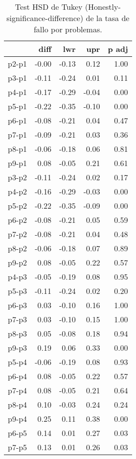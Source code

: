 \begin{table}[H]
\centering
\caption{Test HSD de Tukey (Honestly-significance-difference) de la tasa de fallo por problemas.}
\label{tab:Tukeyfailratio}
\begin{tabular}{rrrrr}
  \hline
 & diff & lwr & upr & p adj \\ 
  \hline
p2-p1 & -0.00 & -0.13 & 0.12 & 1.00 \\ 
  p3-p1 & -0.11 & -0.24 & 0.01 & 0.11 \\ 
  p4-p1 & -0.17 & -0.29 & -0.04 & 0.00 \\ 
  p5-p1 & -0.22 & -0.35 & -0.10 & 0.00 \\ 
  p6-p1 & -0.08 & -0.21 & 0.04 & 0.47 \\ 
  p7-p1 & -0.09 & -0.21 & 0.03 & 0.36 \\ 
  p8-p1 & -0.06 & -0.18 & 0.06 & 0.81 \\ 
  p9-p1 & 0.08 & -0.05 & 0.21 & 0.61 \\ 
  p3-p2 & -0.11 & -0.24 & 0.02 & 0.17 \\ 
  p4-p2 & -0.16 & -0.29 & -0.03 & 0.00 \\ 
  p5-p2 & -0.22 & -0.35 & -0.09 & 0.00 \\ 
  p6-p2 & -0.08 & -0.21 & 0.05 & 0.59 \\ 
  p7-p2 & -0.08 & -0.21 & 0.04 & 0.48 \\ 
  p8-p2 & -0.06 & -0.18 & 0.07 & 0.89 \\ 
  p9-p2 & 0.08 & -0.05 & 0.22 & 0.57 \\ 
  p4-p3 & -0.05 & -0.19 & 0.08 & 0.95 \\ 
  p5-p3 & -0.11 & -0.24 & 0.02 & 0.20 \\ 
  p6-p3 & 0.03 & -0.10 & 0.16 & 1.00 \\ 
  p7-p3 & 0.03 & -0.10 & 0.15 & 1.00 \\ 
  p8-p3 & 0.05 & -0.08 & 0.18 & 0.94 \\ 
  p9-p3 & 0.19 & 0.06 & 0.33 & 0.00 \\ 
  p5-p4 & -0.06 & -0.19 & 0.08 & 0.93 \\ 
  p6-p4 & 0.08 & -0.05 & 0.22 & 0.57 \\ 
  p7-p4 & 0.08 & -0.05 & 0.21 & 0.64 \\ 
  p8-p4 & 0.10 & -0.03 & 0.24 & 0.24 \\ 
  p9-p4 & 0.25 & 0.11 & 0.38 & 0.00 \\ 
  p6-p5 & 0.14 & 0.01 & 0.27 & 0.03 \\ 
  p7-p5 & 0.13 & 0.01 & 0.26 & 0.03 \\ 

\end{tabular}
\end{table}
